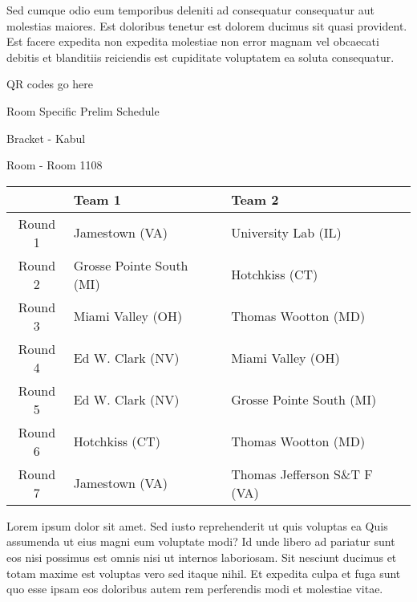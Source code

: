 \documentclass{article}%
\begin{document}
\newline%
Sed cumque odio eum temporibus deleniti ad consequatur consequatur aut molestias maiores. Est doloribus tenetur est dolorem ducimus sit quasi provident. Est facere expedita non expedita molestiae non error magnam vel obcaecati debitis et blanditiis reiciendis est cupiditate voluptatem ea soluta consequatur.%
\vspace*{140pt}%
\begin{center}%
\begin{Huge}%
QR codes go here%
\end{Huge}%
\end{center}%
\newpage%
\begin{center}%
\begin{Huge}%
Room Specific Prelim Schedule%
\end{Huge}%
\vspace*{8pt}%
\linebreak%
\begin{Large}%
Bracket {-} Kabul%
\end{Large}%
\vspace*{8pt}%
\linebreak%
\vspace*{8pt}%
\begin{Large}%
Room {-} Room 1108%
\end{Large}%
\end{center}%
%
\begin{tabularx}{\textwidth}{|c|Y|Y|}%
\hline%
&Team 1&Team 2\\%
\hline%
Round 1&Jamestown (VA)&University Lab (IL)\\%
Round 2&Grosse Pointe South (MI)&Hotchkiss (CT)\\%
Round 3&Miami Valley (OH)&Thomas Wootton (MD)\\%
Round 4&Ed W. Clark (NV)&Miami Valley (OH)\\%
Round 5&Ed W. Clark (NV)&Grosse Pointe South (MI)\\%
Round 6&Hotchkiss (CT)&Thomas Wootton (MD)\\%
Round 7&Jamestown (VA)&Thomas Jefferson S\&T F (VA)\\%
\hline%
\end{tabularx}%
\vspace*{8pt}%
\newline%
Lorem ipsum dolor sit amet. Sed iusto reprehenderit ut quis voluptas ea Quis assumenda ut eius magni eum voluptate modi? Id unde libero ad pariatur sunt eos nisi possimus est omnis nisi ut internos laboriosam. Sit nesciunt ducimus et totam maxime est voluptas vero sed itaque nihil. Et expedita culpa et fuga sunt quo esse ipsam eos doloribus autem rem perferendis modi et molestiae vitae.\newline%
\end{document}

